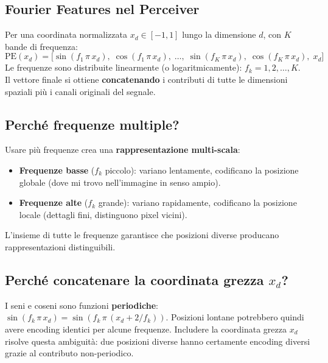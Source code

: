 \documentclass[
  11pt,
]{article}
\begin{document}
\subsection{Fourier Features nel Perceiver}

\begin{formulabox}[title={\textbf{Positional encoding con Fourier features (Perceiver)}}]
Per una coordinata normalizzata $x_d \in [-1, 1]$ lungo la dimensione $d$, con $K$ bande di frequenza:
\[
\text{PE}(x_d) = \bigl[\sin(f_1\,\pi\,x_d),\;\cos(f_1\,\pi\,x_d),\;\ldots,\;\sin(f_K\,\pi\,x_d),\;\cos(f_K\,\pi\,x_d),\;x_d\bigr]
\]
Le frequenze sono distribuite linearmente (o logaritmicamente): $f_k = 1, 2, \ldots, K$.\\
Il vettore finale si ottiene \textbf{concatenando} i contributi di tutte le dimensioni spaziali più i canali originali del segnale.
\end{formulabox}

\subsection{Perché frequenze multiple?}

Usare più frequenze crea una \textbf{rappresentazione multi-scala}:
\begin{itemize}
  \item \textbf{Frequenze basse} ($f_k$ piccolo): variano lentamente, codificano la posizione globale (dove mi trovo nell'immagine in senso ampio).
  \item \textbf{Frequenze alte} ($f_k$ grande): variano rapidamente, codificano la posizione locale (dettagli fini, distinguono pixel vicini).
\end{itemize}
L'insieme di tutte le frequenze garantisce che posizioni diverse producano rappresentazioni distinguibili.

\subsection{Perché concatenare la coordinata grezza $x_d$?}

I seni e coseni sono funzioni \textbf{periodiche}: $\sin(f_k\,\pi\,x_d) = \sin(f_k\,\pi\,(x_d + 2/f_k))$. Posizioni lontane potrebbero quindi avere encoding identici per alcune frequenze. Includere la coordinata grezza $x_d$ risolve questa ambiguità: due posizioni diverse hanno certamente encoding diversi grazie al contributo non-periodico.
\end{document}
